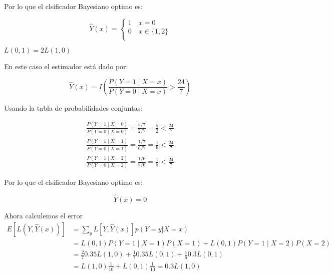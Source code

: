 \documentclass[letter, 11pt, twoside]{report}
\begin{document}
    Por lo que el clsificador Bayesiano optimo es:

    \begin{equation}
        \hat{Y}(x) =
             \begin{cases}
             1 \quad x=0\\
             0 \quad x\in\{1,2\}\\
             \end{cases}
     \end{equation}

    
     
    {\color{mirosa} $L(0,1)=2L(1,0)$}


    En este caso el estimador está dado por:

    \begin{equation}
        \widehat{Y}(x)=I\left(\frac{P(Y=1 \mid X=x)}{P(Y=0 \mid X=x)}>\frac{24}{7}\right) 
    \end{equation}

    Usando la tabla de probabilidades conjuntas:
    
    $$
    \begin{gathered}
    \frac{P(Y=1 \mid X=0)}{P(Y=0 \mid X=0)}=\frac{5 / 7}{2 / 7}=\frac{5}{2}<\frac{24}{7} \\
    \frac{P(Y=1 \mid X=1)}{P(Y=0 \mid X=1)}=\frac{1 / 7}{6 / 7}=\frac{1}{6}<\frac{24}{7} \\
    \frac{P(Y=1 \mid X=2)}{P(Y=0 \mid X=2)}=\frac{1 / 6}{5 / 6}=\frac{1}{5}<\frac{24}{7} 
    \end{gathered}
    $$

    Por lo que el clsificador Bayesiano optimo es:

    \begin{equation}
        \hat{Y}(x) = 0
     \end{equation}



    


    
     Ahora calculemos el error
     $$
     \begin{aligned}
     E[L(Y, \widehat{Y}(x))]& =  \sum_{y}L\left[Y,\hat{Y}(x)\right]  p\left(Y=y|X=x\right)\\
     & = L(0,1) P(Y=1 \mid X=1)P(X=1)+L(0,1) P(Y=1 \mid X=2)P(X=2)\\
     & =\frac{2}{7} 0.35 L(1,0)+\frac{1}{7} 0.35 L(0,1)+\frac{1}{6} 0.3 L(0,1) \\
     & =L(1,0) \frac{1}{10}+L(0,1) \frac{1}{10}=0.3 L(1,0)
     \end{aligned}
     $$




\end{document}
